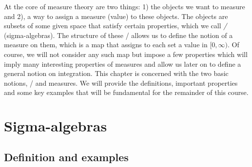 %
%

At the core of measure theory are two things: 1) the objects we want to measure and 2), a way to assign a measure (value) to these objects. The objects are subsets of some given space that satisfy certain properties, which we call \emph{\sigalgs/} (sigma-algebras). The structure of these \sigalgs/ allows us to define the notion of a measure on them, which is a map that assigns to each set a value in $[0,\infty)$. Of course, we will not consider any such map but impose a few properties which will imply many interesting properties of measures and allow us later on to define a general notion on integration. This chapter is concerned with the two basic notions, \sigalgs/ and measures. We will provide the definitions, important properties and some key examples that will be fundamental for the remainder of this course.


\section{Sigma-algebras}



\subsection{Definition and examples}

